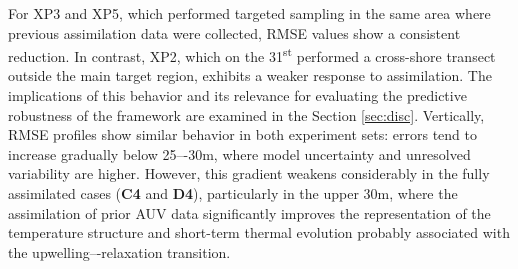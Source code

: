 For XP3 and XP5, which performed targeted sampling in the same area
where previous assimilation data were collected, RMSE values show a
consistent reduction. In contrast, XP2, which on the
31\textsuperscript{st} performed a cross-shore transect outside the
main target region, exhibits a weaker response to assimilation. The
implications of this behavior and its relevance for evaluating the
predictive robustness of the framework are examined in the Section
\ref{sec:disc}.  Vertically, RMSE profiles show similar behavior in
both experiment sets: errors tend to increase gradually below 25–-30m,
where model uncertainty and unresolved variability are
higher. However, this gradient weakens considerably in the fully
assimilated cases (\textbf{C4} and \textbf{D4}), particularly in the
upper 30m, where the assimilation of prior AUV data significantly
improves the representation of the temperature structure and
short-term thermal evolution probably associated with the
upwelling–-relaxation transition.












